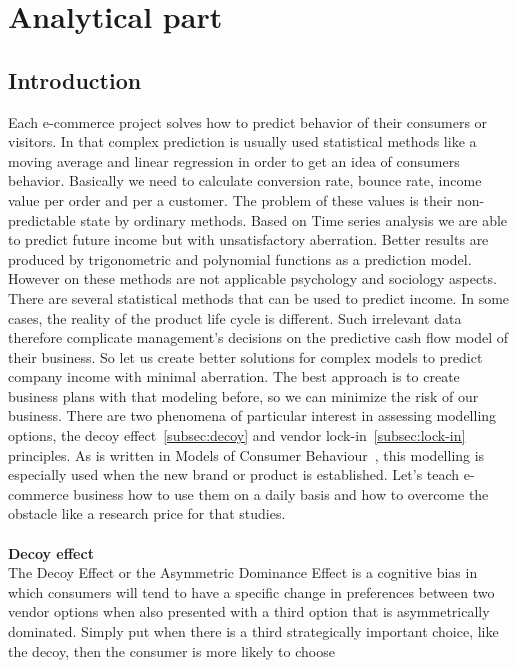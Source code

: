 
\chapter{Analytical part} \label{sec:analytical}

\section{Introduction} \label{sec:introduction}
Each e-commerce project solves how to predict behavior of their consumers or visitors.
In that complex prediction is usually used statistical methods like a moving average and linear regression in order to
get an idea of consumers behavior.
Basically we need to calculate conversion rate, bounce rate, income value per order and per a customer.
The problem of these values is their non-predictable state by ordinary methods.
Based on Time series analysis we are able to predict
future income but with unsatisfactory aberration.
Better results are produced by trigonometric and polynomial functions as a prediction model.
However on these methods are not applicable psychology and sociology aspects.
There are several statistical methods that can be used to predict income.
In some cases, the reality of the product life cycle is different.
Such irrelevant data therefore complicate management's decisions on the predictive cash flow model of their business.
So let us create better solutions for complex models to predict company income with minimal aberration.
The best approach is to create business plans with that modeling before, so we can minimize the risk of our business.
There are  two phenomena of particular interest in assessing modelling options,  the decoy effect~\ref{subsec:decoy} and vendor lock-in~\ref{subsec:lock-in} principles.
As is written in Models of Consumer Behaviour~\cite{patel}, this modelling is especially used when the new brand or product is established.
Let's teach e-commerce business how to use them on a daily basis and how to overcome the obstacle like a research price for that studies.\\
\\
\textbf{Decoy effect} \label{subsec:decoy}\\
The Decoy Effect or the Asymmetric Dominance Effect is a cognitive bias in which consumers will tend to have a specific
change in preferences between two vendor options when also presented with a third option that is asymmetrically dominated.
Simply put when there is a third strategically important choice, like the decoy, then the consumer is more likely to choose

